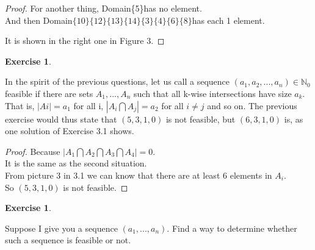 \documentclass[12pt,a4]{article}
\newtheorem{exercise}[theorem]{Exercise}
\begin{document}
\begin{proof}

    For another thing, Domain\{5\}has no element.
    \\And then Domain$\{10\}\{12\}\{13\}\{14\}\{3\}\{4\}\{6\}\{8\}$has each 1 element.

    It is shown in the right one in Figure 3.
\end{proof}

\begin{exercise}
\end{exercise}
	In the spirit of the previous questions, let us call a sequence $(a_1,a_2,...,a_n)\in\mathbb{N}_0$ feasible if there are sets $A_1,...,A_n$ such that all k-wise intersections have size $a_k$. That is, $|Ai| = a_{1}$ for all i, $|A_i \bigcap A_j| = a_2$ for all $i \not= j$ and so on. The previous exercise would thus state that $(5, 3, 1, 0)$ is not feasible, but $(6, 3, 1, 0)$ is, as one solution of Exercise 3.1 shows.

\begin{proof}
	Because $|A_1 \bigcap A_2 \bigcap A_3 \bigcap A_4 |=0$.
\\ It is the same as the second situation.
\\From picture 3 in 3.1 we can know that there are at least 6 elements in $A_i$.
\\So $(5,3,1,0)$ is not feasible.
\end{proof}


\begin{exercise}
\end{exercise}
	Suppose I give you a sequence $(a_1,...,a_n)$. Find a way to determine whether such a sequence is feasible or not.
\end{document}

